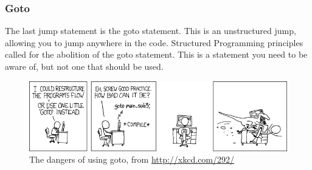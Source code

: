 \clearpage
\subsubsection{Goto} %
\label{sub:goto}

The last jump statement is the goto statement. This is an unstructured jump, allowing you to jump anywhere in the code. Structured Programming principles called for the abolition of the goto statement. This is a statement you need to be aware of, but not one that should be used.

\begin{figure}[h]
   \centering
   \includegraphics[width=\textwidth]{./topics/control-flow/images/goto} 
   \caption{The dangers of using goto, from \url{http://xkcd.com/292/}}
   \label{fig:goto}
\end{figure}


